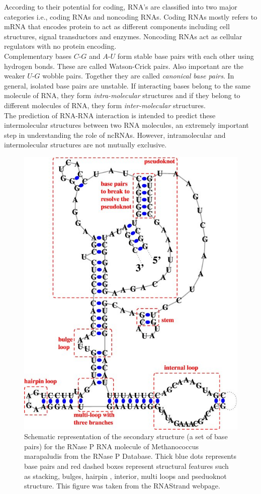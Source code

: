 \documentclass[twoside,a4paper]{report}
\numberwithin{equation}{section}
\begin{document}
	According to their potential for coding, RNA's are classified into two major categories i.e., coding RNAs and noncoding RNAs. Coding RNAs mostly refers to mRNA that encodes protein to act as different components including cell structures, signal transductors and enzymes. Noncoding RNAs act as cellular regulators with no protein encoding.\\
	Complementary bases $C$-$G$ and $A$-$U$ form stable base pairs with each other using hydrogen bonds. These are called Watson-Crick pairs. Also important are the weaker $U$-$G$ wobble pairs. Together they are called \textit{canonical base pairs}. In general, isolated base pairs are unstable. If interacting bases belong to the same molecule of RNA, they form \textit{intra-molecular} structures and if they belong to different molecules of RNA, they form \textit{inter-molecular} structures.\\
	
	The prediction of RNA-RNA interaction is intended to predict these intermolecular structures between two RNA molecules, an extremely important step in understanding the role of ncRNAs. However, intramolecular and intermolecular structures are not mutually exclusive.\\
	
	\begin{figure}[h]
	\includegraphics[width=0.7\linewidth]{secondary_structure}
	\centering
	\caption{Schematic representation of the secondary structure (a set of base pairs) for the RNase P RNA molecule of Methanococcus marapaludis from the RNase P Database. Thick blue dots represents base pairs and red dashed boxes represent structural features such as stacking, bulges, hairpin , interior, multi loops and pseduoknot structure. This figure was taken from the RNAStrand webpage.
	\label{fig:secondarystructure} 
    \citep{andronescu2008rna}}
	\end{figure}
\end{document}
